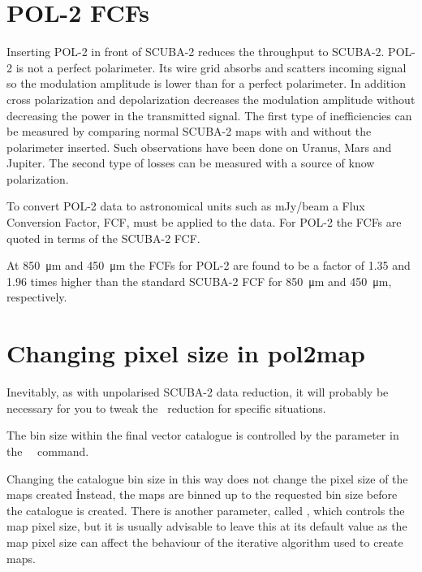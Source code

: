 \section{POL-2 FCFs}
\label{sec:pol2map-fcf}

Inserting POL-2 in front of SCUBA-2 reduces the throughput to SCUBA-2.
POL-2 is not a perfect polarimeter. Its wire grid absorbs and scatters incoming
signal so the modulation amplitude is lower than for a perfect polarimeter.
In addition cross polarization and depolarization decreases the modulation
amplitude without decreasing the power in the transmitted signal. The first
type of inefficiencies can be measured by comparing normal SCUBA-2 maps with
and without the polarimeter inserted. Such observations have been done on Uranus,
Mars and Jupiter. The second type of losses can be measured with a source of know polarization.

To convert POL-2 data to astronomical units such as mJy/beam a Flux Conversion
Factor, FCF, must be applied to the data. For POL-2 the FCFs are quoted in terms of
the SCUBA-2 FCF.

At \SI{850}{\micro\metre} and \SI{450}{\micro\metre} the FCFs for POL-2
are found to be a factor of 1.35 and 1.96 times higher than the
standard SCUBA-2 FCF for \SI{850}{\micro\metre} and \SI{450}{\micro\metre}, respectively.


\section{Changing pixel size in pol2map}
\label{sec:pol2map-pixelsize}

Inevitably, as with unpolarised SCUBA-2 data reduction, it will
probably be necessary for you to tweak the \poltwomap\ reduction for
specific situations.

The bin size within the final vector catalogue is controlled by the
 parameter in the \SMURF\ \poltwomap\ command.

\begin{terminalv}
\end{terminalv}

Changing the catalogue bin size in this way does not change the pixel
size of the maps created \poltwomap\. Instead, the maps are binned up
to the requested bin size before the catalogue is created. There is
another parameter, called , which controls the map pixel
size, but it is usually advisable to leave this at its default value
as the map pixel size can affect the behaviour of the iterative algorithm
used to create maps.







